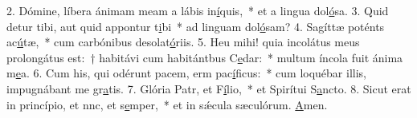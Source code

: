 2. Dómine, líbera ánimam meam a lábis in\uline{í}quis,~* et a lingua dol\uline{ó}sa.
3. Quid detur tibi, aut quid appontur t\uline{i}bi~* ad linguam dol\uline{ó}sam?
4. Sagíttæ poténts ac\uline{ú}tæ,~* cum carbónibus desolat\uline{ó}riis.
5. Heu mihi! quia incolátus meus prolongátus est:~† habitávi cum habitántbus C\uline{e}dar:~* multum íncola fuit ánima m\uline{e}a.
6. Cum his, qui odérunt pacem, erm pac\uline{í}ficus:~* cum loquébar illis, impugnábant me gr\uline{a}tis.
7. Glória Patr, et F\uline{í}lio,~* et Spirítui S\uline{a}ncto.
8. Sicut erat in princípio, et nnc, et s\uline{e}mper,~* et in sǽcula sæculórum. \uline{A}men.
